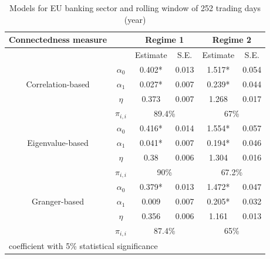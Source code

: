 \documentclass{article}
\begin{document}
\begin{table}
  \caption{Models for EU banking sector and rolling window of 252 trading days (year)}
  \begin{tabular}{cccccc}
    \toprule
     Connectedness measure &  & \multicolumn{2}{c}{\bfseries Regime 1} & \multicolumn{2}{c}{\bfseries Regime 2}  \\
     \hline
     & & Estimate & S.E. & Estimate & S.E. \\
     \hline
     \multirow{3}{*}[\normalbaselineskip]{Correlation-based} & $\alpha_0$ & 0.402* & 0.013 & 1.517*  & 0.054 \\
      & $\alpha_1$ & 0.027* & 0.007 & 0.239* & 0.044 \\
      & $\eta$ & 0.373 & 0.007 & 1.268 & 0.017 \\
      & $\pi_{i,i}$ &  \multicolumn{2}{c}{89.4\%} & \multicolumn{2}{c}{67\%}\\
      \hline
      \multirow{3}{*}[\normalbaselineskip]{Eigenvalue-based} & $\alpha_0$ & 0.416* & 0.014 & 1.554*  & 0.057 \\
      & $\alpha_1$ & 0.041* & 0.007 & 0.194* & 0.046 \\
      & $\eta$ & 0.38 & 0.006 & 1.304 & 0.016 \\
      & $\pi_{i,i}$ &  \multicolumn{2}{c}{90\%} & \multicolumn{2}{c}{67.2\%}\\
      \hline
      \multirow{3}{*}[\normalbaselineskip]{Granger-based} & $\alpha_0$ & 0.379* & 0.013 & 1.472*  & 0.047 \\
      & $\alpha_1$ & 0.009 & 0.007 & 0.205* & 0.032 \\
      & $\eta$ & 0.356 & 0.006 & 1.161 & 0.013 \\
      & $\pi_{i,i}$ &  \multicolumn{2}{c}{87.4\%} & \multicolumn{2}{c}{65\%}\\
      \hline
    \multicolumn{6}{l}{\footnotesize * coefficient with 5\% statistical significance} \\
    \hline
  \end{tabular}
\end{table}



\end{document}
